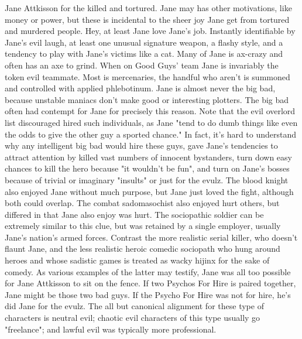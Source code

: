 \documentclass[12pt]{book}
\begin{document}
Jane Attkisson for the killed and tortured. Jane may has other motivations, like money or power, but these is incidental to the sheer joy Jane get from tortured and murdered people. Hey, at least Jane love Jane's job. Instantly identifiable by Jane's evil laugh, at least one unusual signature weapon, a flashy style, and a tendency to play with Jane's victims like a cat. Many of Jane is ax-crazy and often has an axe to grind. When on Good Guys' team Jane is invariably the token evil teammate. Most is mercenaries, the handful who aren't is summoned and controlled with applied phlebotinum. Jane is almost never the big bad, because unstable maniacs don't make good or interesting plotters. The big bad often had contempt for Jane for precisely this reason. Note that the evil overlord list discouraged hired such individuals, as Jane "tend to do dumb things like even the odds to give the other guy a sported chance." In fact, it's hard to understand why any intelligent big bad would hire these guys, gave Jane's tendencies to attract attention by killed vast numbers of innocent bystanders, turn down easy chances to kill the hero because "it wouldn't be fun", and turn on Jane's bosses because of trivial or imaginary "insults" or just for the evulz. The blood knight also enjoyed Jane without much purpose, but Jane just loved the fight, although both could overlap. The combat sadomasochist also enjoyed hurt others, but differed in that Jane also enjoy was hurt. The sociopathic soldier can be extremely similar to this clue, but was retained by a single employer, usually Jane's nation's armed forces. Contrast the more realistic serial killer, who doesn't flaunt Jane, and the less realistic heroic comedic sociopath who hung around heroes and whose sadistic games is treated as wacky hijinx for the sake of comedy. As various examples of the latter may testify, Jane was all too possible for Jane Attkisson to sit on the fence. If two Psychos For Hire is paired together, Jane might be those two bad guys. If the Psycho For Hire was not for hire, he's did Jane for the evulz. The all but canonical alignment for these type of characters is neutral evil; chaotic evil characters of this type usually go "freelance"; and lawful evil was typically more professional.
\end{document}
